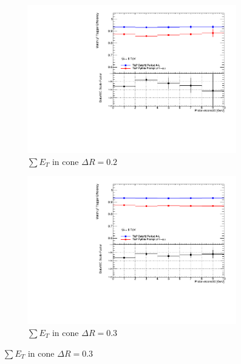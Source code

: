 \begin{figure}[phtb]
  \centering
    \begin{subfigure}[b]{0.60\textwidth}
      \includegraphics[width=\textwidth]{PartCalibration2012/Plots/SFPlots/etcone20_smt.pdf}
      \caption{$\sum E_{T}$ in cone $\Delta R=0.2$} \label{fig:CalibrationIsoEtcone20}
    \end{subfigure}
    
    \begin{subfigure}[b]{0.60\textwidth}
      \includegraphics[width=\textwidth]{PartCalibration2012/Plots/SFPlots/etcone30_smt.pdf}
      \caption{$\sum E_{T}$ in cone $\Delta R=0.3$} \label{fig:CalibrationIsoEtcone30}
    \end{subfigure}


\end{figure}

